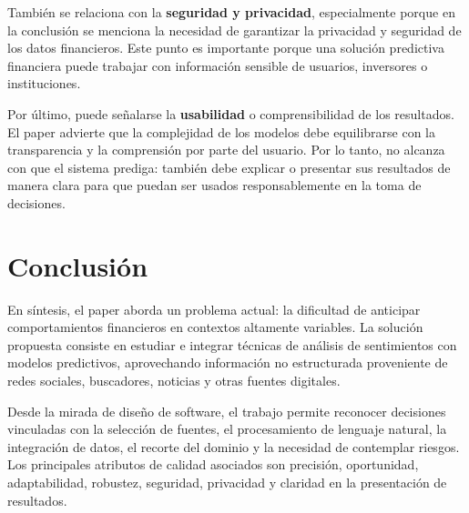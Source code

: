 \vspace{2mm}

También se relaciona con la \textbf{seguridad y privacidad}, especialmente porque en la conclusión se menciona la necesidad de garantizar la privacidad y seguridad de los datos financieros. Este punto es importante porque una solución predictiva financiera puede trabajar con información sensible de usuarios, inversores o instituciones.

\vspace{2mm}

Por último, puede señalarse la \textbf{usabilidad} o comprensibilidad de los resultados. El paper advierte que la complejidad de los modelos debe equilibrarse con la transparencia y la comprensión por parte del usuario. Por lo tanto, no alcanza con que el sistema prediga: también debe explicar o presentar sus resultados de manera clara para que puedan ser usados responsablemente en la toma de decisiones.


\section{Conclusión}
\vspace{2mm}

En síntesis, el paper aborda un problema actual: la dificultad de anticipar comportamientos financieros en contextos altamente variables. La solución propuesta consiste en estudiar e integrar técnicas de análisis de sentimientos con modelos predictivos, aprovechando información no estructurada proveniente de redes sociales, buscadores, noticias y otras fuentes digitales.

\vspace{2mm}

Desde la mirada de diseño de software, el trabajo permite reconocer decisiones vinculadas con la selección de fuentes, el procesamiento de lenguaje natural, la integración de datos, el recorte del dominio y la necesidad de contemplar riesgos. Los principales atributos de calidad asociados son precisión, oportunidad, adaptabilidad, robustez, seguridad, privacidad y claridad en la presentación de resultados.